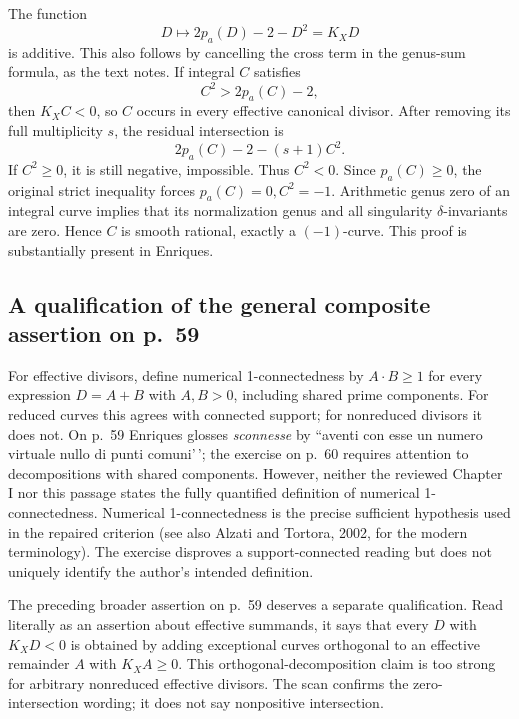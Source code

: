 The function \[
D\longmapsto2p_a(D)-2-D^2=K_X D
\] is additive. This also follows by cancelling the cross term in the genus-sum formula, as the text notes. If integral \(C\) satisfies \[
C^2>2p_a(C)-2,
\] then \(K_X C<0\), so \(C\) occurs in every effective canonical divisor. After removing its full multiplicity \(s\), the residual intersection is \[
2p_a(C)-2-(s+1)C^2.
\] If \(C^2\ge0\), it is still negative, impossible. Thus \(C^2<0\). Since \(p_a(C)\ge0\), the original strict inequality forces \(p_a(C)=0,C^2=-1\). Arithmetic genus zero of an integral curve implies that its normalization genus and all singularity \(\delta\)-invariants are zero. Hence \(C\) is smooth rational, exactly a \((-1)\)-curve. This proof is substantially present in Enriques.

\subsection{A qualification of the general composite assertion on p.~59}

For effective divisors, define numerical 1-connectedness by \(A\cdot B\ge1\) for every expression \(D=A+B\) with \(A,B>0\), including shared prime components. For reduced curves this agrees with connected support; for nonreduced divisors it does not. On p.~59 Enriques glosses \emph{sconnesse} by ``aventi con esse un numero virtuale nullo di punti comuni'\,'; the exercise on p.~60 requires attention to decompositions with shared components. However, neither the reviewed Chapter I nor this passage states the fully quantified definition of numerical 1-connectedness. Numerical 1-connectedness is the precise sufficient hypothesis used in the repaired criterion (see also Alzati and Tortora, 2002, for the modern terminology). The exercise disproves a support-connected reading but does not uniquely identify the author's intended definition.

The preceding broader assertion on p.~59 deserves a separate qualification. Read literally as an assertion about effective summands, it says that every \(D\) with \(K_X D<0\) is obtained by adding exceptional curves orthogonal to an effective remainder \(A\) with \(K_X A\ge0\). This orthogonal-decomposition claim is too strong for arbitrary nonreduced effective divisors. The scan confirms the zero-intersection wording; it does not say nonpositive intersection.

